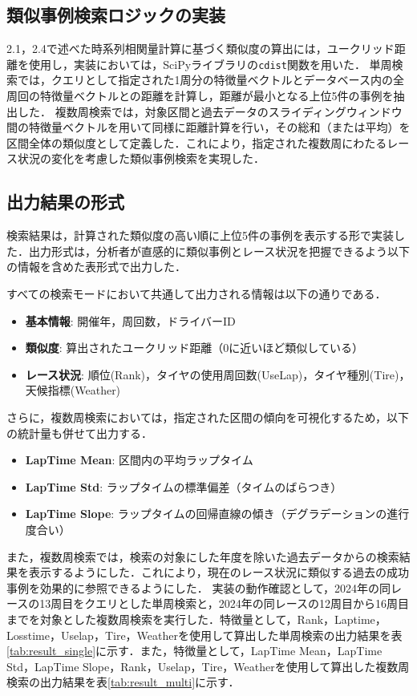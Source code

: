 \documentclass{deimj}
\begin{document}
\subsection{類似事例検索ロジックの実装}

2.1，2.4で述べた時系列相関量計算に基づく類似度の算出には，ユークリッド距離を使用し，実装においては，SciPyライブラリの\texttt{cdist}関数を用いた．
単周検索では，クエリとして指定された1周分の特徴量ベクトルとデータベース内の全周回の特徴量ベクトルとの距離を計算し，距離が最小となる上位5件の事例を抽出した．
複数周検索では，対象区間と過去データのスライディングウィンドウ間の特徴量ベクトルを用いて同様に距離計算を行い，その総和（または平均）を区間全体の類似度として定義した．これにより，指定された複数周にわたるレース状況の変化を考慮した類似事例検索を実現した．

\subsection{出力結果の形式}

検索結果は，計算された類似度の高い順に上位5件の事例を表示する形で実装した．出力形式は，分析者が直感的に類似事例とレース状況を把握できるよう以下の情報を含めた表形式で出力した．

すべての検索モードにおいて共通して出力される情報は以下の通りである．
\begin{itemize}
  \item \textbf{基本情報}: 開催年，周回数，ドライバーID
  \item \textbf{類似度}: 算出されたユークリッド距離（0に近いほど類似している）
  \item \textbf{レース状況}: 順位(Rank)，タイヤの使用周回数(UseLap)，タイヤ種別(Tire)，天候指標(Weather)
\end{itemize}

さらに，複数周検索においては，指定された区間の傾向を可視化するため，以下の統計量も併せて出力する．
\begin{itemize}
  \item \textbf{LapTime Mean}: 区間内の平均ラップタイム
  \item \textbf{LapTime Std}: ラップタイムの標準偏差（タイムのばらつき）
  \item \textbf{LapTime Slope}: ラップタイムの回帰直線の傾き（デグラデーションの進行度合い）
\end{itemize}

また，複数周検索では，検索の対象にした年度を除いた過去データからの検索結果を表示するようにした．これにより，現在のレース状況に類似する過去の成功事例を効果的に参照できるようにした．
実装の動作確認として，2024年の同レースの13周目をクエリとした単周検索と，2024年の同レースの12周目から16周目までを対象とした複数周検索を実行した．特徴量として，Rank，Laptime，Losstime，Uselap，Tire，Weatherを使用して算出した単周検索の出力結果を表\ref{tab:result_single}に示す．また，特徴量として，LapTime Mean，LapTime Std，LapTime Slope，Rank，Uselap，Tire，Weatherを使用して算出した複数周検索の出力結果を表\ref{tab:result_multi}に示す．
\end{document}
